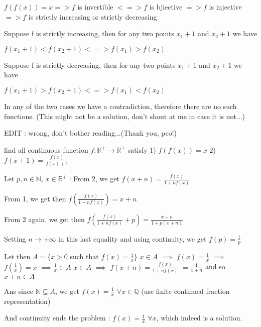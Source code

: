 \begin{solution}
	$f(f(x))=x  =>  f $ is invertible $ <=>  f $ is bjiective $ =>  f $ is injective$ =>  f $ is strictly increasing or strictly decreasing

Suppose f is strictly increasing, then for any two points $x_{1}+1$ and $x_{2}+1$ we have  

$ f(x_{1}+1)<f(x_{2}+1) <=> f(x_{1})>f(x_{2})$

Suppose f is strictly decreasing, then for any two points $x_{1}+1$ and $x_{2}+1$ we have  

$ f(x_{1}+1)>f(x_{2}+1) <=> f(x_{1})<f(x_{2})$

In any of the two cases we have a contradiction, therefore there are no such functions.
(This might not be a solution, don't shout at me in case it is not...)

EDIT : wrong, don't bother reading...(Thank you, pco!)
\end{solution}



\begin{solution}
	\begin{tcolorbox}find all continuous function $ f:\mathbb{R}^{+}\to\mathbb{R}^{+} $ satisfy
1) $f(f(x))=x$
2)$ \displaystyle f(x+1)=\frac{f(x)}{f(x)+1} $\end{tcolorbox}
Let $p,n\in\mathbb  N$, $x\in\mathbb R^+$ :
From 2, we get $f(x+n)=\frac {f(x)}{1+nf(x)}$

From 1, we get then $f(\frac {f(x)}{1+nf(x)})=x+n$

From 2 again, we get then $f(\frac {f(x)}{1+nf(x)}+p)=\frac{x+n}{1+p(x+n)}$

Setting $n\to+\infty$ in this last equality and using continuity, we get $f(p)=\frac 1p$

Let then $A=\{x>0$ such that $f(x)=\frac 1x\}$
$x\in A$ $\implies$ $f(x)=\frac 1x$ $\implies$ $f(\frac 1x)=x$ $\implies$$\frac 1x\in A$
$x\in A$ $\implies$ $f(x+n)=\frac {f(x)}{1+nf(x)}$ $=\frac {1}{x+n}$ and so $x+n\in A$

Ans since $\mathbb N\subseteq A$, we get $f(x)=\frac 1x$ $\forall x\in\mathbb Q$ (use finite continued fraction representation)

And continuity ends the problem : $\boxed{f(x)=\frac 1x}$ $\forall x$, which indeed is a solution.
\end{solution}



